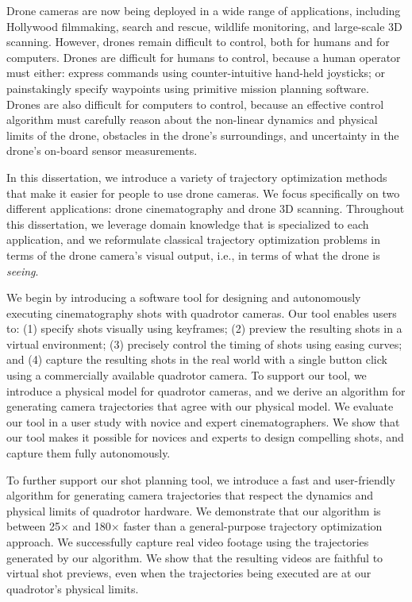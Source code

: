 
Drone cameras are now being deployed in a wide range of applications, including Hollywood filmmaking, search and rescue, wildlife monitoring, and large-scale 3D scanning.
However, drones remain difficult to control, both for humans and for computers.
Drones are difficult for humans to control, because a human operator must either: express commands using counter-intuitive hand-held joysticks; or painstakingly specify waypoints using primitive mission planning software.
Drones are also difficult for computers to control, because an effective control algorithm must carefully reason about the non-linear dynamics and physical limits of the drone, obstacles in the drone's surroundings, and uncertainty in the drone's on-board sensor measurements.

In this dissertation, we introduce a variety of trajectory optimization methods that make it easier for people to use drone cameras.
We focus specifically on two different applications: drone cinematography and drone 3D scanning.
Throughout this dissertation, we leverage domain knowledge that is specialized to each application, and we reformulate classical trajectory optimization problems in terms of the drone camera's visual output, i.e., in terms of what the drone is \emph{seeing}.

We begin by introducing a software tool for designing and autonomously executing cinematography shots with quadrotor cameras.
Our tool enables users to: (1) specify shots visually using keyframes; (2) preview the resulting shots in a virtual environment; (3) precisely control the timing of shots using easing curves; and (4) capture the resulting shots in the real world with a single button click using a commercially available quadrotor camera.
To support our tool, we introduce a physical model for quadrotor cameras, and we derive an algorithm for generating camera trajectories that agree with our physical model.
We evaluate our tool in a user study with novice and expert cinematographers.
We show that our tool makes it possible for novices and experts to design compelling shots, and capture them fully autonomously.

To further support our shot planning tool, we introduce a fast and user-friendly algorithm for generating camera trajectories that respect the dynamics and physical limits of quadrotor hardware.
We demonstrate that our algorithm is between 25$\times$ and 180$\times$ faster than a general-purpose trajectory optimization approach.
We successfully capture real video footage using the trajectories generated by our algorithm.
We show that the resulting videos are faithful to virtual shot previews, even when the trajectories being executed are at our quadrotor's physical limits.

